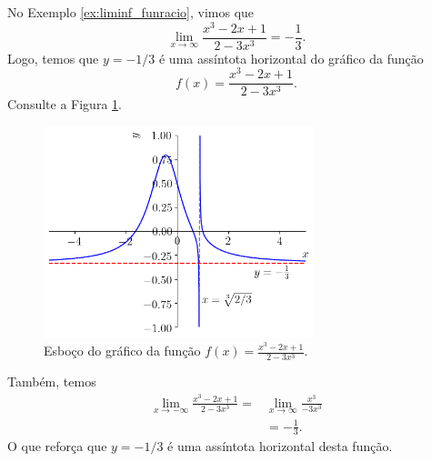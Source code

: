 \begin{ex}\label{ex:ass_hor}
  No Exemplo \ref{ex:liminf_funracio}, vimos que
  \begin{equation}
    \lim_{x\to\infty} \frac{x^3 - 2x + 1}{2 - 3x^3} = -\frac{1}{3}.
  \end{equation}
  Logo, temos que $y=-1/3$ é uma assíntota horizontal do gráfico da função
  \begin{equation}
    f(x) = \frac{x^3 - 2x + 1}{2 - 3x^3}.
  \end{equation}
  Consulte a Figura \ref{fig:ex_ass_horizon}.

      \begin{figure}[H]
      \centering
      \includegraphics[width=0.7\textwidth]{./cap_lim/dados/fig_ex_ass_horizon/fig_ex_ass_horizon}
      \caption{Esboço do gráfico da função $\displaystyle f(x) = \frac{x^3 - 2x + 1}{2 - 3x^3}$.}
      \label{fig:ex_ass_horizon}
    \end{figure}

  Também, temos
  \begin{align}
    \lim_{x\to -\infty} \frac{x^3 - 2x + 1}{2 - 3x^3} =& \lim_{x\to\infty} \frac{x^3}{-3x^3}\\
                                                       &= -\frac{1}{3}.
  \end{align}
  O que reforça que $y = -1/3$ é uma assíntota horizontal desta função.
\end{ex}

